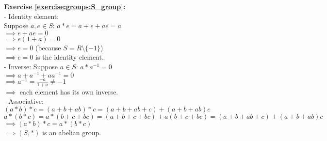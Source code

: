\noindent\textbf{Exercise \ref{exercise:groups:S_group}:}
\\
- Identity element:\\
Suppose $a,e\in S$: $a*e=a+e+ae=a$\\
$\implies e+ae=0$\\
$\implies e(1+a)=0$\\
$\implies e=0$ (because $S=R\setminus\{-1\}$)\\
$\implies e=0$ is the identity element.\\
- Inverse: Suppose $a\in S$: $a*a^{-1}=0$\\
$\implies a+a^{-1}+aa^{-1}=0$\\
$\implies a^{-1}=\displaystyle\frac{-a}{1+a}\neq -1$\\
$\implies$  each element has its own inverse.\\
- Associative:\\
$(a*b)*c=(a+b+ab)*c=(a+b+ab+c)+(a+b+ab)c$\\
$a*(b*c)=a*(b+c+bc)=(a+b+c+bc)+a(b+c+bc)=(a+b+ab+c)+(a+b+ab)c$\\
$\implies (a*b)*c=a*(b*c)$\\
$\implies (S,*)$ is an abelian group.\\
\\

